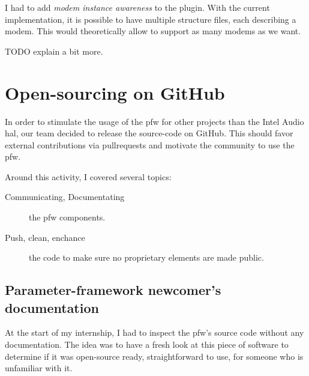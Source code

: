 I had to add \emph{modem instance awareness} to the plugin. With the current implementation, it
is possible to have multiple structure files, each describing a modem. This would theoretically allow
to support as many modems as we want.

TODO explain a bit more.

\section{Open-sourcing on GitHub}
In order to stimulate the usage of the \gls{pfw} for other projects than the Intel Audio \gls{hal},
our team decided to release the source-code on \gls{GitHub}.
This should favor external contributions via \gls{pullrequests} and motivate
the community to use the \gls{pfw}.

Around this activity, I covered several topics:
\begin{description}
    \item[Communicating, Documentating] the \gls{pfw} components.
    \item[Push, clean, enchance] the code to make sure no proprietary
        elements are made public.
\end{description}

\subsection{Parameter-framework newcomer's documentation}\label{sec:tutorials}

At the start of my internship, I had to inspect the \gls{pfw}'s
source code without any documentation. The idea was to have a fresh look at
this piece of software to determine if it was open-source ready, straightforward
to use, for someone who is unfamiliar with it.

